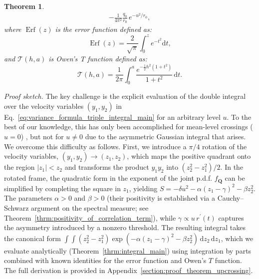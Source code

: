 \documentclass[journal]{IEEEtran}
\theoremstyle{plain}
\newtheorem{theorem}{Theorem}[section]
\theoremstyle{definition}
\theoremstyle{remark}
\newcommand{\Ot}{\mathcal{T}}
\newcommand{\Erf}{\operatorname{Erf}}
\newcommand{\dd}{\mathrm{d}}
\begin{document}
\begin{theorem}
\begin{multline}
    - \frac{1}{4\pi^2}\frac{q_0}{r_0}\,e^{-u^2/r_0},
\label{eq:Iup_final_result_owensT}
\end{multline}
where $\Erf(z)$ is the error function defined as:
\begin{equation}
\Erf(z) = \frac{2}{\sqrt{\pi}} \int_0^z e^{-t^2}  \dd t, 
\end{equation}
and $\Ot(h, a)$ is Owen's T function \cite{owen1980table} defined as:
\begin{equation}
\Ot(h, a) = \frac{1}{2\pi} \int_0^a \frac{e^{-\frac{1}{2}h^2(1+t^2)}}{1+t^2} \, \dd t. 
\end{equation}
\end{theorem}





\textit{Proof sketch.} The key challenge is the explicit evaluation of the double integral over the velocity variables $(y_1, y_2)$ in Eq.~\eqref{eq:variance_formula_triple_integral_main} for an arbitrary level $u$. To the best of our knowledge, this has only been accomplished for mean-level crossings ($u=0$) \cite{steinberg1955short, leadbetter1965variance, pawula1968analysis, lindgren1974spectral, wilson2017periodicity}, but not for $u\neq 0$ due to the asymmetric Gaussian integral that arises. We overcome this difficulty as follows. First, we introduce a $\pi/4$ rotation of the velocity variables, $(y_1, y_2) \rightarrow (z_1, z_2)$, which maps the positive quadrant onto the region $|z_1| < z_2$ and transforms the product $y_1 y_2$ into $(z_2^2 - z_1^2)/2$. In the rotated frame, the quadratic form in the exponent of the joint p.d.f. $f_{\mathbf{Q}}$ can be simplified by completing the square in $z_1$, yielding $S = -\delta u^2 - \alpha(z_1 - \gamma)^2 - \beta z_2^2$. The parameters $\alpha > 0$ and $\beta > 0$ (their positivity is established via a Cauchy--Schwarz argument on the spectral measure; see Theorem~\ref{thrm:positivity_of_correlation_term}), while $\gamma \propto u \, r^\prime(t)$ captures the asymmetry introduced by a nonzero threshold. The resulting integral takes the canonical form $\int\!\!\int (z_2^2 - z_1^2) \exp(-\alpha(z_1 - \gamma)^2 - \beta z_2^2) \, \dd z_2 \, \dd z_1$, which we evaluate analytically (Theorem~\ref{thrm:integral_main}) using integration by parts combined with known identities for the error function and Owen's $T$ function. The full derivation is provided in Appendix~\ref{section:proof_theorem_upcrossing}.
\end{document}
